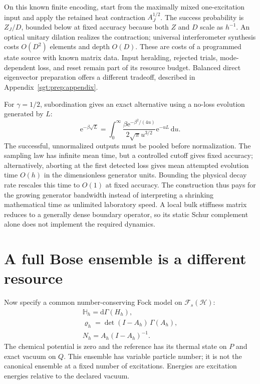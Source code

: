 \documentclass[aps,pra,reprint,superscriptaddress,longbibliography]{revtex4-2}
\newcommand{\dd}{\mathrm d}
\newcommand{\ee}{\mathrm e}
\begin{document}
On this known finite encoding, start from the maximally mixed
one-excitation input and apply the retained heat contraction $A_J^{1/2}$.
The success probability is $Z_J/D$, bounded below at fixed accuracy
because both $Z$ and $D$ scale as $h^{-1}$. An optical unitary dilation
realizes the contraction; universal interferometer synthesis
\cite{Clements2016} costs $O(D^2)$ elements and depth $O(D)$.
These are costs of a programmed state source with known matrix data.
Input heralding, rejected trials, mode-dependent loss, and reset remain
part of its resource budget. Balanced direct eigenvector preparation
offers a different tradeoff, described in
Appendix~\ref{sgt:prep:appendix}.

For $\gamma=1/2$, subordination gives an exact alternative using a
no-loss evolution generated by $L$:
\begin{equation}
 \ee^{-\beta\sqrt L}=\int_0^\infty
 \frac{\beta\ee^{-\beta^2/(4u)}}{2\sqrt\pi u^{3/2}}
 \ee^{-uL}\,\dd u .
 \label{sgt:main:subordination}
\end{equation}
The successful, unnormalized outputs must be pooled before
normalization. The sampling law has infinite mean time, but a controlled
cutoff gives fixed accuracy; alternatively, aborting at the first
detected loss gives mean attempted evolution time $O(h)$ in the
dimensionless generator units. Bounding the physical decay rate rescales
this time to $O(1)$ at fixed accuracy. The construction thus pays for
the growing generator bandwidth instead of interpreting a shrinking
mathematical time as unlimited laboratory speed. A local bulk stiffness
matrix reduces to a generally dense boundary operator, so its static
Schur complement alone does not implement the required dynamics.

\section{A full Bose ensemble is a different resource}
\label{sgt:main:bose}

Now specify a common number-conserving Fock model on
$\mathcal F_s(\mathcal H)$:
\begin{equation}
\begin{gathered}
 \mathbb H_h=\dd\Gamma(H_h),\\
 \varrho_h=\det(I-A_h)\,\Gamma(A_h),\\
 N_h=A_h(I-A_h)^{-1}.
 \label{sgt:main:fock}
\end{gathered}
\end{equation}
The chemical potential is zero and the reference has its thermal
state on $P$ and exact vacuum on $Q$. This ensemble has variable
particle number; it is not the canonical ensemble at a fixed number
of excitations. Energies are excitation energies relative to the
declared vacuum.
\end{document}
